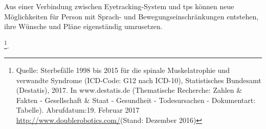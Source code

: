 Aus einer Verbindung zwischen Eyetracking-System und \acs{tps} können neue Möglichkeiten für Person mit Sprach- und Bewegungseinschränkungen entstehen, ihre Wünsche und Pläne eigenständig umzusetzen.

\footnote{Quelle: Sterbefälle 1998 bis 2015 für die spinale Muskelatrophie und verwandte Syndrome (ICD-Code: G12 nach ICD-10), Statistisches Bundesamt (Destatis), 2017. In www.destatis.de (Thematische Recherche: Zahlen \& Fakten - Gesellschaft \& Staat - Gesundheit - Todesursachen - Dokumentart: Tabelle). Abrufdatum:19. Februar 2017 \url{http://www.doublerobotics.com/}(Stand: Dezember 2016)}.
